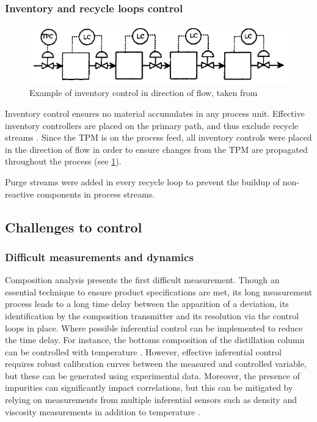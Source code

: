 \subsubsection{Inventory and recycle loops control} %
    \begin{figure}
        \centering
        \includegraphics[width=\linewidth]{chapters/4-operation-control/4-Figures/TPM-Price-1994.png}
        \caption{Example of inventory control in direction of flow, taken from \textcite{price_throughput_1994}}
        \label{fig:TPM}
    \end{figure}
Inventory control ensures no material accumulates in any process unit. Effective inventory controllers are placed on the primary path, and thus exclude recycle streams \cite{price_throughput_1994}. Since the TPM is on the process feed, all inventory controls were placed in the direction of flow in order to ensure changes from the TPM are propagated throughout the process (see \cref{fig:TPM}). 

Purge streams were added in every recycle loop to prevent the buildup of non-reactive components in process streams.  


\subsection{Challenges to control}%

\subsubsection{Difficult measurements and dynamics} %
Composition analysis presents the first difficult measurement. Though an essential technique to ensure product specifications are met, its long measurement process leads to a long time delay between the apparition of a deviation, its identification by the composition transmitter and its resolution via the control loops in place. Where possible inferential control can be implemented to reduce the time delay. For instance, the bottoms composition of the distillation column can be controlled with temperature \cite{kister_distillation_1990}. However, effective inferential control requires robust calibration curves between the measured and controlled variable, but these can be generated using experimental data. Moreover, the presence of impurities can significantly impact correlations, but this can be mitigated by relying on measurements from multiple inferential sensors such as density and viscosity measurements in addition to temperature \cite{aavos_international_liquid_nodate}.

